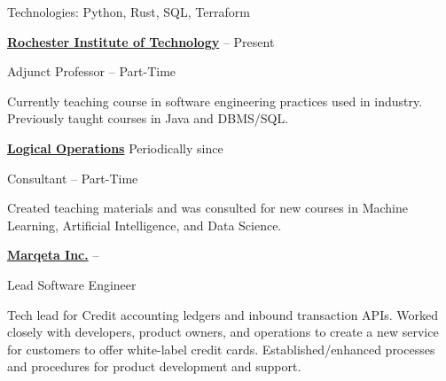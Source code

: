 \documentclass[letterpaper,MMMMyyyy,nonstopmode]{simpleresumecv}
\newif\ifLOCATION
\begin{document}
\begin{Body}
\begin{Detail}

\Gap
Technologies: Python, Rust, SQL, Terraform

\Gap

\end{Detail}

\BigGap

\Entry
\href{http://ist.rit.edu/}
{\textbf{Rochester Institute of Technology}}
\hfill
 --
Present

Adjunct Professor -- Part-Time
\ifLOCATION
\hfill 
Rochester, New York
\fi

\begin{Detail}
\BulletItem
Currently teaching course in software engineering practices used in industry.
\BulletItem
Previously taught courses in Java and DBMS/SQL.
\end{Detail}

\BigGap

\Entry
\href{http://logicalopertions.com/}
{\textbf{Logical Operations}}
\hfill
Periodically since 

Consultant -- Part-Time
\ifLOCATION
\hfill 
Rochester, New York
\fi

\begin{Detail}
\BulletItem
Created teaching materials and was consulted for new courses in Machine Learning, Artificial Intelligence, and Data Science.
\end{Detail}

\BigGap

\Entry
\href{https://www.marqeta.com}
{\textbf{Marqeta Inc.}}
\hfill
 -- 

Lead Software Engineer
\ifLOCATION
\hfill
Rochester, New York
\fi

\begin{Detail}
\BulletItem
Tech lead for Credit accounting ledgers and inbound transaction APIs.
Worked closely with developers, product owners, and operations to create a new service for customers to offer white-label credit cards. 
\BulletItem
Established/enhanced processes and procedures for product development and support.


\end{Detail}
\end{Body}
\end{document}
